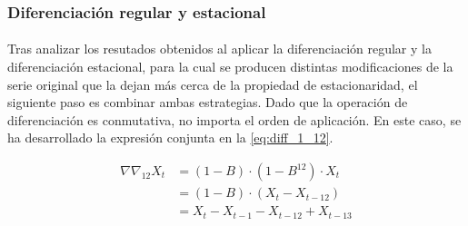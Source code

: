 \documentclass[a4paper, spanish]{article}
\begin{document}
      \subsubsection{Diferenciación regular y estacional}
      \label{sec:regular_seasonal_difference}

        \paragraph{}
        Tras analizar los resutados obtenidos al aplicar la diferenciación regular y la diferenciación estacional, para la cual se producen distintas modificaciones de la serie original que la dejan más cerca de la propiedad de estacionaridad, el siguiente paso es combinar ambas estrategias. Dado que la operación de diferenciación es conmutativa, no importa el orden de aplicación. En este caso, se ha desarrollado la expresión conjunta en la \autoref{eq:diff_1_12}.

        \begin{equation}
        \label{eq:diff_1_12}
          \begin{split}
            \nabla \nabla_{12} X_t
            &= (1 - B) \cdot (1 - B^{12}) \cdot X_t \\
            &= (1 - B) \cdot (X_t - X_{t - 12}) \\
            &= X_t - X_{t - 1} - X_{t - 12} + X_{t - 13}
          \end{split}
        \end{equation}
\end{document}
